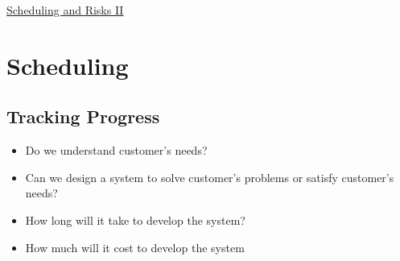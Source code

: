 \documentclass{article}[18pt]
\begin{document}
\begin{center}
\underline{\huge Scheduling and Risks II}
\end{center}
\section{Scheduling}
\subsection{Tracking Progress}
\begin{itemize}
	\item Do we understand customer's needs?
	\item Can we design a system to solve customer's problems or satisfy customer's needs?
	\item How long will it take to develop the system?
	\item How much will it cost to develop the system
\end{itemize}
\end{document}
